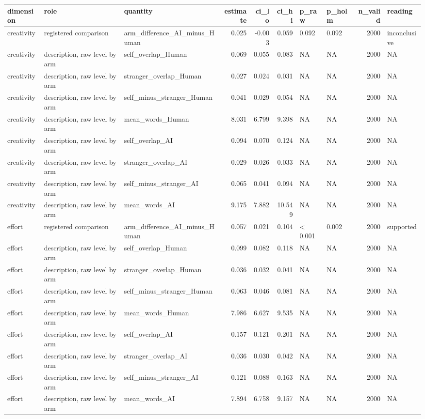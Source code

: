 \begin{table}[!h]
{\begin{tabular}[t]{lllrrrllrl}
\toprule
dimension & role & quantity & estimate & ci\_lo & ci\_hi & p\_raw & p\_holm & n\_valid & reading\\
\midrule
creativity & registered comparison & arm\_difference\_AI\_minus\_Human & 0.025 & -0.003 & 0.059 & 0.092 & 0.092 & 2000 & inconclusive\\
creativity & description, raw level by arm & self\_overlap\_Human & 0.069 & 0.055 & 0.083 & NA & NA & 2000 & NA\\
creativity & description, raw level by arm & stranger\_overlap\_Human & 0.027 & 0.024 & 0.031 & NA & NA & 2000 & NA\\
creativity & description, raw level by arm & self\_minus\_stranger\_Human & 0.041 & 0.029 & 0.054 & NA & NA & 2000 & NA\\
creativity & description, raw level by arm & mean\_words\_Human & 8.031 & 6.799 & 9.398 & NA & NA & 2000 & NA\\
\addlinespace
creativity & description, raw level by arm & self\_overlap\_AI & 0.094 & 0.070 & 0.124 & NA & NA & 2000 & NA\\
creativity & description, raw level by arm & stranger\_overlap\_AI & 0.029 & 0.026 & 0.033 & NA & NA & 2000 & NA\\
creativity & description, raw level by arm & self\_minus\_stranger\_AI & 0.065 & 0.041 & 0.094 & NA & NA & 2000 & NA\\
creativity & description, raw level by arm & mean\_words\_AI & 9.175 & 7.882 & 10.549 & NA & NA & 2000 & NA\\
effort & registered comparison & arm\_difference\_AI\_minus\_Human & 0.057 & 0.021 & 0.104 & < 0.001 & 0.002 & 2000 & supported\\
\addlinespace
effort & description, raw level by arm & self\_overlap\_Human & 0.099 & 0.082 & 0.118 & NA & NA & 2000 & NA\\
effort & description, raw level by arm & stranger\_overlap\_Human & 0.036 & 0.032 & 0.041 & NA & NA & 2000 & NA\\
effort & description, raw level by arm & self\_minus\_stranger\_Human & 0.063 & 0.046 & 0.081 & NA & NA & 2000 & NA\\
effort & description, raw level by arm & mean\_words\_Human & 7.986 & 6.627 & 9.535 & NA & NA & 2000 & NA\\
effort & description, raw level by arm & self\_overlap\_AI & 0.157 & 0.121 & 0.201 & NA & NA & 2000 & NA\\
\addlinespace
effort & description, raw level by arm & stranger\_overlap\_AI & 0.036 & 0.030 & 0.042 & NA & NA & 2000 & NA\\
effort & description, raw level by arm & self\_minus\_stranger\_AI & 0.121 & 0.088 & 0.163 & NA & NA & 2000 & NA\\
effort & description, raw level by arm & mean\_words\_AI & 7.894 & 6.758 & 9.157 & NA & NA & 2000 & NA\\
\bottomrule
\end{tabular}}
\end{table}
